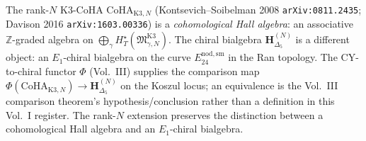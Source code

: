 \begin{remark}
\label{rem:thqg-occ-coha-vs-chiral}
The rank-$N$ K3-CoHA $\mathrm{CoHA}_{\mathrm{K3}, N}$ (Kontsevich--Soibelman
2008 \texttt{arXiv:0811.2435}; Davison 2016
\texttt{arXiv:1603.00336}) is a \emph{cohomological Hall algebra}: an
associative $\mathbb{Z}$-graded algebra on
$\bigoplus_\gamma H^\star_T(\mathfrak{M}^{\mathrm{K3}}_{\gamma, N})$.
The chiral bialgebra $\mathbf H^{(N)}_{\Delta_5}$ is a different
object: an $E_1$-chiral bialgebra on the curve
$E^{\mathrm{nod,sm}}_{24}$ in the Ran topology. The CY-to-chiral
functor $\Phi$ (Vol.~III) supplies the comparison map
$\Phi(\mathrm{CoHA}_{\mathrm{K3},N}) \to
\mathbf H^{(N)}_{\Delta_5}$ on the Koszul locus; an equivalence is
the Vol.~III comparison theorem's hypothesis/conclusion rather than a
definition in this Vol.~I register. The rank-$N$ extension preserves
the distinction between a cohomological Hall algebra and an
$E_1$-chiral bialgebra.
\end{remark}
